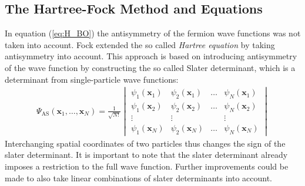 \documentclass[twoside,        %
			   11pt,			%
               BCOR10mm,       %
               ngerman,english  %
               ]{scrartcl}
\begin{document}
\subsection{The Hartree-Fock Method and Equations}
In equation (\ref{eq:H_BO}) the antisymmetry of the fermion wave functions was not taken into account. Fock extended the so called \textit{Hartree equation} by taking antisymmetry into account. This approach is based on introducing antisymmetry of the wave function by constructing the so called Slater determinant, which is a determinant from single-particle wave functions:
\begin{align*}
\Psi_\text{AS}(\mathbf{x}_1, \dots, \mathbf{x}_N) = \frac{1}{\sqrt{N!}}
\begin{vmatrix}
\psi_1(\mathbf{x}_1) &\psi_2(\mathbf{x}_1)& \dots &\psi_N (\mathbf{x}_1) \\
\psi_1(\mathbf{x}_2) &\psi_2(\mathbf{x}_2)& \dots &\psi_N (\mathbf{x}_2) \\
\vdots & \vdots & & \vdots \\
\psi_1(\mathbf{x}_N)& \psi_2(\mathbf{x}_N)& \dots& \psi_N (\mathbf{x}_N)
\end{vmatrix}
\end{align*} 
Interchanging spatial coordinates of two particles thus changes the sign of the slater determinant. It is important to note that the slater determinant already imposes a restriction to the full wave function. Further improvements could be made to also take linear combinations of slater determinants into account.
\end{document}
